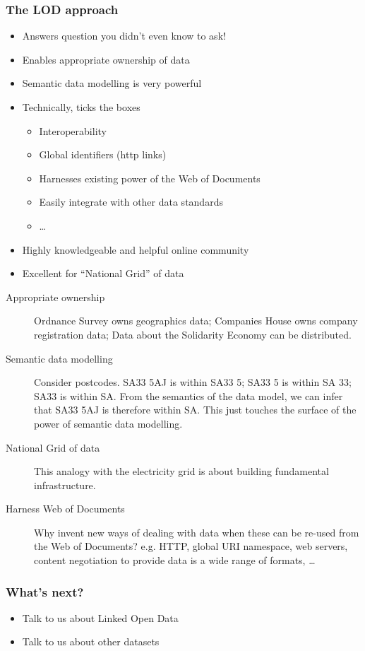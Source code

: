 {
  \frametitle{The LOD approach}
  \begin{itemize}
    \item<1-> Answers question you didn't even know to ask!
    \item<1-> Enables appropriate ownership of data
    \item<2-> Semantic data modelling is very powerful
    \item<2-> Technically, ticks the boxes
      \begin{itemize}
	\item Interoperability
	\item Global identifiers (http links)
	\item Harnesses existing power of the Web of Documents
	\item Easily integrate with other data standards
	\item \dots
      \end{itemize}
    \item<3-> Highly knowledgeable and helpful online community
    \item<4-> Excellent for ``National Grid'' of data
  \end{itemize}
}
\slideend
\begin{description}
  \item[Appropriate ownership] Ordnance Survey owns geographics data; Companies House owns company registration data; Data about the Solidarity Economy can be distributed.
  \item[Semantic data modelling] \geek Consider postcodes. SA33 5AJ is within SA33 5; SA33 5 is within SA 33; SA33 is within SA. From the semantics of the data model, we can infer that SA33 5AJ is therefore within SA. This just touches the surface of the power of semantic data modelling.
  \item[National Grid of data] This analogy with the electricity grid is about building fundamental infrastructure.
  \item[Harness Web of Documents] \geek Why invent new ways of dealing with data when these can be re-used from the Web of Documents? e.g. HTTP, global URI namespace, web servers, content negotiation to provide data is a wide range of formats, \dots
\end{description}
\startslide
\frame
{
  \frametitle{What's next?}
  \begin{itemize}
    \item Talk to us about Linked Open Data
    \item Talk to us about other datasets
  \end{itemize}
}
\slideend

